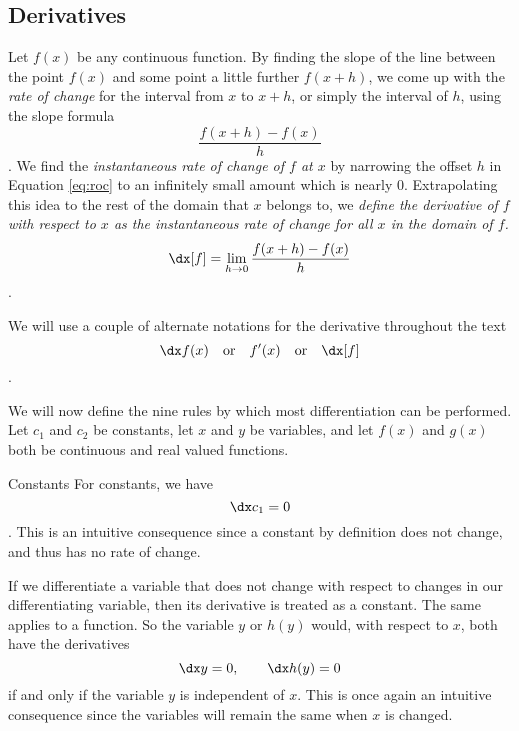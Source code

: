 \subsection{Derivatives}

Let $f(x)$ be any continuous function. By finding the slope of the line between
the point $f(x)$ and some point a little further $f(x+h)$, we come up with the
\emph{rate of change} for the interval from $x$ to $x + h$, or simply the interval of $h$, using the slope
formula
\begin{equation}\label{eq:roc}
    \frac{f(x+h)-f(x)}{h}
\end{equation}
. We find the \emph{instantaneous rate of change of $f$ at $x$} by
narrowing the offset $h$ in Equation \ref{eq:roc} to an infinitely small
amount which is nearly 0. Extrapolating this idea to the rest of the domain that $x$
belongs to, we \emph{define the derivative of $f$ with respect to $x$ as the
instantaneous rate of change for all $x$ in the domain of $f$.}
\begin{equation}\label{eq:derivative}
    \dx[f] = \lim_{h\rightarrow 0} \frac{f(x + h) - f(x)}{h}
\end{equation}.

We will use a couple of alternate notations for the derivative
throughout the text
\begin{equation*}
    \dx f(x) \quad \text{or} \quad f'(x) \quad \text{or} \quad \dx[f]
\end{equation*}.



We will now define the nine rules by which most differentiation can be performed. Let $c_1$ and $c_2$ be constants, let $x$ and $y$ be variables, and let $f(x)$ and $g(x)$ both be continuous and real valued functions.

\begin{psec}{Constants}\label{rule:derivative constants} For constants,
    we have
    \begin{equation}\label{eq:derivative constant}
        \dx c_1 = 0
    \end{equation}
    . This is an intuitive consequence since a constant by definition does not
    change, and thus has no rate of change.

    If we differentiate a variable that does not change with respect to changes in our differentiating variable, then its derivative is treated as a constant. The same applies to a function. So the variable $y$ or $h(y)$ would, with respect to $x$, both have the derivatives
    \begin{equation*}
        \dx y = 0, \quad \quad \dx h(y) = 0
    \end{equation*} if and only if the variable $y$ is independent of $x$. This is once again an intuitive consequence since the variables will remain the same when $x$ is changed.

\end{psec}

